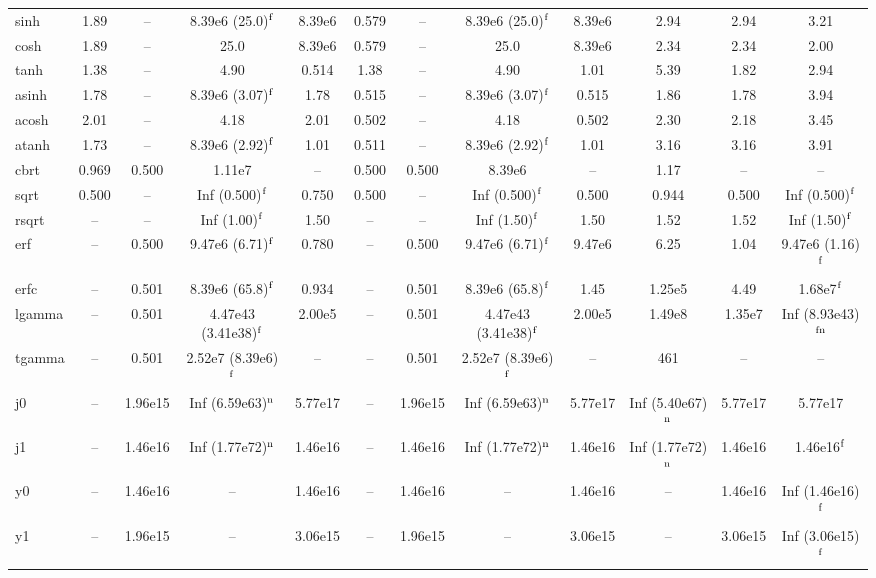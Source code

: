 \begin{table}
\begin{small}
\begin{tabular}{|l|cccc|cccc|cc|c|}
sinh & 1.89 & -- & 8.39e6 (25.0)$^{\rm f}$ & 8.39e6 & 0.579 & -- & 8.39e6 (25.0)$^{\rm f}$ & 8.39e6 & 2.94 & 2.94 & 3.21 \\
cosh & 1.89 & -- & 25.0 & 8.39e6 & 0.579 & -- & 25.0 & 8.39e6 & 2.34 & 2.34 & 2.00 \\
tanh & 1.38 & -- & 4.90 & 0.514 & 1.38 & -- & 4.90 & 1.01 & 5.39 & 1.82 & 2.94 \\
asinh & 1.78 & -- & 8.39e6 (3.07)$^{\rm f}$ & 1.78 & 0.515 & -- & 8.39e6 (3.07)$^{\rm f}$ & 0.515 & 1.86 & 1.78 & 3.94 \\
acosh & 2.01 & -- & 4.18 & 2.01 & 0.502 & -- & 4.18 & 0.502 & 2.30 & 2.18 & 3.45 \\
atanh & 1.73 & -- & 8.39e6 (2.92)$^{\rm f}$ & 1.01 & 0.511 & -- & 8.39e6 (2.92)$^{\rm f}$ & 1.01 & 3.16 & 3.16 & 3.91 \\
cbrt & 0.969 & 0.500 & 1.11e7 & -- & 0.500 & 0.500 & 8.39e6 & -- & 1.17 & -- & -- \\
sqrt & 0.500 & -- & Inf (0.500)$^{\rm f}$ & 0.750 & 0.500 & -- & Inf (0.500)$^{\rm f}$ & 0.500 & 0.944 & 0.500 & Inf (0.500)$^{\rm f}$ \\
rsqrt & -- & -- & Inf (1.00)$^{\rm f}$ & 1.50 & -- & -- & Inf (1.50)$^{\rm f}$ & 1.50 & 1.52 & 1.52 & Inf (1.50)$^{\rm f}$ \\
erf & -- & 0.500 & 9.47e6 (6.71)$^{\rm f}$ & 0.780 & -- & 0.500 & 9.47e6 (6.71)$^{\rm f}$ & 9.47e6 & 6.25 & 1.04 & 9.47e6 (1.16)$^{\rm f}$ \\
erfc & -- & 0.501 & 8.39e6 (65.8)$^{\rm f}$ & 0.934 & -- & 0.501 & 8.39e6 (65.8)$^{\rm f}$ & 1.45 & 1.25e5 & 4.49 & 1.68e7$^{\rm f}$ \\
lgamma & -- & 0.501 & 4.47e43 (3.41e38)$^{\rm f}$ & 2.00e5 & -- & 0.501 & 4.47e43 (3.41e38)$^{\rm f}$ & 2.00e5 & 1.49e8 & 1.35e7 & Inf (8.93e43)$^{\rm fn}$ \\
tgamma & -- & 0.501 & 2.52e7 (8.39e6)$^{\rm f}$ & -- & -- & 0.501 & 2.52e7 (8.39e6)$^{\rm f}$ & -- & 461 & -- & -- \\
j0 & -- & 1.96e15 & Inf (6.59e63)$^{\rm n}$ & 5.77e17 & -- & 1.96e15 & Inf (6.59e63)$^{\rm n}$ & 5.77e17 & Inf (5.40e67)$^{\rm n}$ & 5.77e17 & 5.77e17 \\
j1 & -- & 1.46e16 & Inf (1.77e72)$^{\rm n}$ & 1.46e16 & -- & 1.46e16 & Inf (1.77e72)$^{\rm n}$ & 1.46e16 & Inf (1.77e72)$^{\rm n}$ & 1.46e16 & 1.46e16$^{\rm f}$ \\
y0 & -- & 1.46e16 & -- & 1.46e16 & -- & 1.46e16 & -- & 1.46e16 & -- & 1.46e16 & Inf (1.46e16)$^{\rm f}$ \\
y1 & -- & 1.96e15 & -- & 3.06e15 & -- & 1.96e15 & -- & 3.06e15 & -- & 3.06e15 & Inf (3.06e15)$^{\rm f}$ \\

\end{tabular}
\end{small}
\end{table}
